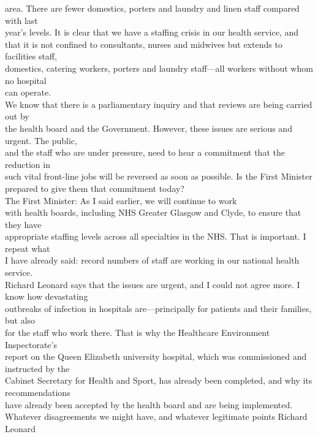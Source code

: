 \documentclass{article}
\begin{document}
\begin{description}
{area. There are fewer domestics, porters and laundry and linen staff compared with last\\
year’s levels. It is clear that we have a staffing crisis in our health service, and\\
that it is not confined to consultants, nurses and midwives but extends to facilities staff,\\
domestics, catering workers, porters and laundry staff—all workers without whom no hospital\\
can operate.\\
We know that there is a parliamentary inquiry and that reviews are being carried out by\\
the health board and the Government. However, these issues are serious and urgent. The public,\\
and the staff who are under pressure, need to hear a commitment that the reduction in\\
such vital front-line jobs will be reversed as soon as possible. Is the First Minister\\
prepared to give them that commitment today?\\
The First Minister: As I said earlier, we will continue to work\\
with health boards, including NHS Greater Glasgow and Clyde, to ensure that they have\\
appropriate staffing levels across all specialties in the NHS. That is important. I repeat what\\
I have already said: record numbers of staff are working in our national health service.\\
Richard Leonard says that the issues are urgent, and I could not agree more. I know how devastating\\
outbreaks of infection in hospitals are—principally for patients and their families, but also\\
for the staff who work there. That is why the Healthcare Environment Inspectorate’s\\
report on the Queen Elizabeth university hospital, which was commissioned and instructed by the\\
Cabinet Secretary for Health and Sport, has already been completed, and why its recommendations\\
have already been accepted by the health board and are being implemented.\\
Whatever disagreements we might have, and whatever legitimate points Richard Leonard\\
}
\end{description}
\end{document}
